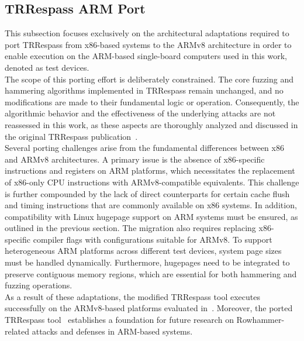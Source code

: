     \subsection{TRRespass ARM Port} \label{subsec:trrespass-arm-port}
        This subsection focuses exclusively on the architectural adaptations required to port TRRespass from 
        x86-based systems to the ARMv8 architecture in order to enable execution on the ARM-based 
        single-board computers used in this work, denoted as test devices.
        \\
        The scope of this porting effort is deliberately constrained. The core fuzzing and hammering 
        algorithms implemented in TRRespass remain unchanged, and no modifications are made to their 
        fundamental logic or operation. Consequently, the algorithmic behavior and the effectiveness 
        of the underlying attacks are not reassessed in this work, as these aspects are thoroughly 
        analyzed and discussed in the original TRRespass publication~\cite{paperTRRespass}.
        \\
        Several porting challenges arise from the fundamental differences between x86 and ARMv8 
        architectures. A primary issue is the absence of x86-specific instructions and registers on 
        ARM platforms, which necessitates the replacement of x86-only CPU instructions with 
        ARMv8-compatible equivalents. This challenge is further compounded by the lack of direct 
        counterparts for certain cache flush and timing instructions that are commonly available on 
        x86 systems. In addition, compatibility with Linux hugepage support on ARM systems must be
        ensured, as outlined in the previous section. The migration also requires replacing x86-specific 
        compiler flags with configurations suitable for ARMv8. To support heterogeneous ARM platforms 
        across different test devices, system page sizes must be handled dynamically. Furthermore, 
        hugepages need to be integrated to preserve contiguous memory regions, which are essential for 
        both hammering and fuzzing operations.
        \\
        As a result of these adaptations, the modified TRRespass tool executes successfully on the 
        ARMv8-based platforms evaluated in~\cite{paperBachelorarbeit}. Moreover, the ported TRRespass 
        tool~\cite{toolHamOnRaspi} establishes a foundation for future research on Rowhammer-related attacks and 
        defenses in ARM-based systems.
